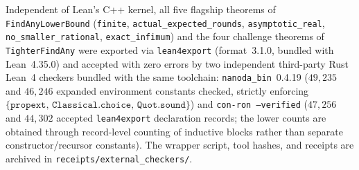 \documentclass[11pt,a4paper]{article}
\theoremstyle{definition}
\theoremstyle{remark}
\begin{document}
Independent of Lean's C++ kernel, all five flagship theorems of \texttt{FindAnyLowerBound} (\texttt{finite}, \texttt{actual\_\allowbreak expected\_\allowbreak rounds}, \texttt{asymptotic\_\allowbreak real}, \texttt{no\_\allowbreak smaller\_\allowbreak rational}, \texttt{exact\_\allowbreak infimum}) and the four challenge theorems of \texttt{TighterFindAny} were exported via \texttt{lean4export} (format~3.1.0, bundled with Lean~4.35.0) and accepted with zero errors by two independent third-party Rust Lean~4 checkers bundled with the same toolchain: \texttt{nanoda\_bin}~0.4.19 \cite{nanoda2026} (\(49{,}235\) and \(46{,}246\) expanded environment constants checked, strictly enforcing \(\{\texttt{propext},\allowbreak\,\texttt{Classical.choice},\allowbreak\,\texttt{Quot.sound}\}\)) and \texttt{con-ron --verified} \cite{conron2026} (\(47{,}256\) and \(44{,}302\) accepted \texttt{lean4export} declaration records; the lower counts are obtained through record-level counting of inductive blocks rather than separate constructor/recursor constants). The wrapper script, tool hashes, and receipts are archived in \texttt{receipts/\allowbreak external\_\allowbreak checkers/}.
\end{document}

